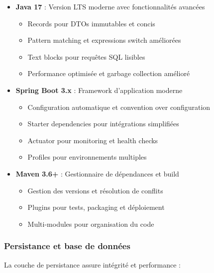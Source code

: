 \documentclass[12pt,a4paper]{report}
\begin{document}
\begin{itemize}
\item \textbf{Java 17} : Version LTS moderne avec fonctionnalités avancées
  \begin{itemize}
  \item Records pour DTOs immutables et concis
  \item Pattern matching et expressions switch améliorées
  \item Text blocks pour requêtes SQL lisibles
  \item Performance optimisée et garbage collection amélioré
  \end{itemize}

\item \textbf{Spring Boot 3.x} : Framework d'application moderne
  \begin{itemize}
  \item Configuration automatique et convention over configuration
  \item Starter dependencies pour intégrations simplifiées
  \item Actuator pour monitoring et health checks
  \item Profiles pour environnements multiples
  \end{itemize}

\item \textbf{Maven 3.6+} : Gestionnaire de dépendances et build
  \begin{itemize}
  \item Gestion des versions et résolution de conflits
  \item Plugins pour tests, packaging et déploiement
  \item Multi-modules pour organisation du code
  \end{itemize}
\end{itemize}

\subsubsection{Persistance et base de données}
La couche de persistance assure intégrité et performance :
\end{document}
